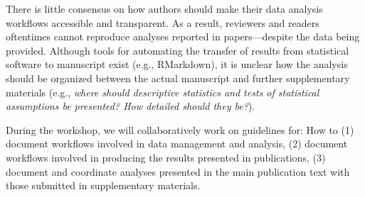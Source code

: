 \documentclass[sigchi-a, authorversion]{acmart}
\begin{document}
There is little consensus on how authors should make their data analysis workflows accessible and transparent. As a result, reviewers and readers oftentimes cannot reproduce analyses reported in papers---despite the data being provided. Although tools for automating the transfer of results from statistical software to manuscript exist (e.g., RMarkdown), it is unclear how the analysis should be organized between the actual manuscript and further supplementary materials (e.g., \emph{where should descriptive statistics and tests of statistical assumptions be presented? How detailed should they be?}).

During the workshop, we will collaboratively work on guidelines for: How to (1) document workflows involved in data management and analysis, (2) document workflows involved in producing the results presented in publications, (3) document and coordinate analyses presented in the main publication text with those submitted in supplementary materials.
\end{document}

